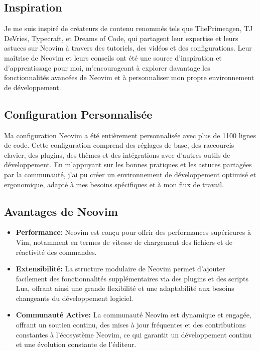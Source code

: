 \subsection{Inspiration}

\hspace{16pt}Je me suis inspiré de créateurs de contenu renommés tels que ThePrimeagen, TJ DeVries, Typecraft, et Dreams of Code, qui partagent leur expertise et leurs astuces sur Neovim à travers des tutoriels, des vidéos et des configurations. Leur maîtrise de Neovim et leurs conseils ont été une source d'inspiration et d'apprentissage pour moi, m'encourageant à explorer davantage les fonctionnalités avancées de Neovim et à personnaliser mon propre environnement de développement.

\subsection{Configuration Personnalisée}

\hspace{16pt}Ma configuration Neovim a été entièrement personnalisée avec plus de 1100 lignes de code. Cette configuration comprend des réglages de base, des raccourcis clavier, des plugins, des thèmes et des intégrations avec d'autres outils de développement. En m'appuyant sur les bonnes pratiques et les astuces partagées par la communauté, j'ai pu créer un environnement de développement optimisé et ergonomique, adapté à mes besoins spécifiques et à mon flux de travail.

\subsection{Avantages de Neovim}

\begin{itemize}
  \item \textbf{Performance: }Neovim est conçu pour offrir des performances supérieures à Vim, notamment en termes de vitesse de chargement des fichiers et de réactivité des commandes.
  \item \textbf{Extensibilité: }La structure modulaire de Neovim permet d'ajouter facilement des fonctionnalités supplémentaires via des plugins et des scripts Lua, offrant ainsi une grande flexibilité et une adaptabilité aux besoins changeants du développement logiciel.
  \item \textbf{Communauté Active: }La communauté Neovim est dynamique et engagée, offrant un soutien continu, des mises à jour fréquentes et des contributions constantes à l'écosystème Neovim, ce qui garantit un développement continu et une évolution constante de l'éditeur.
  
\end{itemize}



